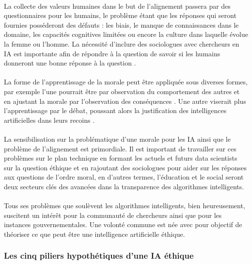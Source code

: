 \documentclass[10pt, french, a4paper]{article}
\begin{document}
\paragraph{}
La collecte des valeurs humaines dans le but de l’alignement passera par des questionnaires pour les humains, le problème étant que les réponses qui seront fournies posséderont des défauts : les biais, le manque de connaissances dans le domaine, les capacités cognitives limitées ou encore la culture dans laquelle évolue la femme ou l’homme. La nécessité d’inclure des sociologues avec chercheurs en IA est importante afin de répondre à la question de savoir si les humains donneront une bonne réponse à la question \citep{irving_ai_2019}.

\paragraph{}
La forme de l’apprentissage de la morale peut être appliquée sous diverses formes, par exemple l’une pourrait être par observation du comportement des autres et en ajustant la morale par l’observation des conséquences \citep{cointe_ethical_2017}. Une autre viserait plus l’apprentissage par le débat, poussant alors la justification des intelligences artificielles dans leurs recoins \citep{irving_ai_2019}.

\paragraph{}
La sensibilisation sur la problématique d’une morale pour les IA ainsi que le problème de l’alignement est primordiale. Il est important de travailler sur ces problèmes sur le plan technique en formant les actuels et futurs data scientists sur la question éthique et en rajoutant des sociologues pour aider sur les réponses aux questions de l’ordre moral, en d’autres termes, l’éducation et le social seront deux secteurs clés des avancées dans la transparence des algorithmes intelligents.

\paragraph{}
Tous ses problèmes que soulèvent les algorithmes intelligents, bien heureusement, suscitent un intérêt pour la communauté de chercheurs ainsi que pour les instances gouvernementales. Une volonté commune est née avec pour objectif de théoriser ce que peut être une intelligence artificielle éthique.

\subsubsection{Les cinq piliers hypothétiques d'une IA éthique}
\end{document}

